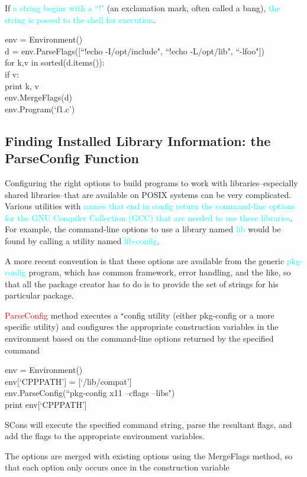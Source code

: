\documentclass[12pt,a4paper]{article}
\begin{document}
If \textcolor{cyan}{a string begins with a ``!"} (an exclamation mark, often called a bang), \textcolor{cyan}{the string is passed to the shell for execution}.

env = Environment() \\
d = env.ParseFlags([``!echo -I/opt/include", ``!echo -L/opt/lib", ``-lfoo"]) \\
for k,v in sorted(d.items()): \\
    if v: \\
        print k, v \\
env.MergeFlags(d) \\
env.Program(`f1.c')


\subsection{Finding Installed Library Information: the ParseConfig Function}
Configuring the right options to build programs to work with libraries--especially shared libraries--that are available on POSIX systems can be very complicated. Various utilities with \textcolor{cyan}{names that end in config return the command-line options for the GNU Compiler Collection (GCC) that are needed to use these libraries}. For example, the command-line options to use a library named \textcolor{cyan}{lib} would be found by calling a utility named \textcolor{cyan}{lib-config}.

A more recent convention is that these options are available from the generic \textcolor{cyan}{pkg-config} program, which has common framework, error handling, and the like, so that all the package creator has to do is to provide the set of strings for his particular package.

\textcolor{red}{ParseConfig} method executes a ${}^\star$config utility (either pkg-config or a more specific utility) and configures the appropriate construction variables in the environment based on the command-line options returned by the specified command

env = Environment() \\
env[`CPPPATH'] = [`/lib/compat'] \\
env.ParseConfig(``pkg-config x11 --cflags --libs") \\
print env[`CPPPATH'] 

SCons will execute the specified command string, parse the resultant flags, and add the flags to the appropriate environment variables.

The options are merged with existing options using the MergeFlags method, so that each option only occurs once in the construction variable
\end{document}
